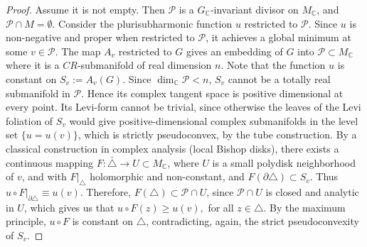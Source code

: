 \documentclass[12pt,reqno]{amsart}\usepackage{amssymb,amsmath,amscd,epsfig,amsthm,enumerate,import,eufrak}
\theoremstyle{definition}
\theoremstyle{remark}
\numberwithin{equation}{section}
\theoremstyle{plain}
\theoremstyle{definition}
\def \c {\mathbb{C}}
\def \mcp {\mathcal{P}}
\def \vs {\vskip 2mm}
\theoremstyle{remark}
\numberwithin{theorem}{section}
\begin{document}
\begin{proof}
Assume it is not empty. Then $\mcp$ is a $G_{\c}$-invariant divisor on $M_{\c}$, and $\mcp \cap M = \emptyset$. Consider the plurisubharmonic function $u$ restricted to $\mcp$. Since $u$ is non-negative and proper when restricted to $\mcp$, it achieves a global minimum at some $v \in \mcp$. The map $A_v$ restricted to $G$ gives an embedding of $G$ into $\mcp \subset M_{\c}$ where it is a $CR$-submanifold of real dimension $n$. Note that the function $u$ is constant on $S_v := A_v(G)$. Since $\dim_{\c} \mcp < n$, $S_v$ cannot be a totally real submanifold in $\mcp$. Hence its complex tangent space is positive dimensional at every point. Its Levi-form cannot be trivial, since otherwise the leaves of the Levi foliation of $S_v$ would give positive-dimensional complex submanifolds in the level set $\{u = u(v)\}$, which is strictly pseudoconvex, by the tube construction. By a classical construction in complex analysis (local Bishop disks), there exists a continuous mapping $F: \bar{\triangle} \to U \subset M_{\c}$, where $U$ is a small polydisk neighborhood of $v$, and with $F|_{\triangle}$ holomorphic and non-constant, and $F(\partial \triangle) \subset S_v$. Thus $u\circ F|_{\partial\triangle} \equiv u(v)$. Therefore, $F(\triangle) \subset \mcp \cap U$, since $\mcp \cap U$ is closed and analytic in $U$, which gives us that $u\circ F(z) \geq u(v),$ for all $z \in \triangle$. By the maximum principle, $u\circ F$ is constant on $\triangle$, contradicting, again, the strict pseudoconvexity of $S_v$. 
%
\end{proof}
%
\vs\vs
%
%
%
%
%
%
%
%
%
%
%
%
%
%
\end{document}
